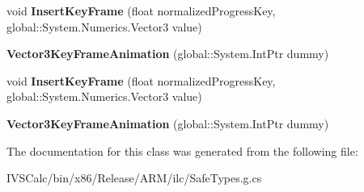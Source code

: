 \begin{DoxyCompactItemize}
\mbox{\label{class_windows_1_1_u_i_1_1_composition_1_1_vector3_key_frame_animation_a9aef830bf8f0a427819998607074969a}} 
void {\bfseries Insert\+Key\+Frame} (float normalized\+Progress\+Key, global\+::\+System.\+Numerics.\+Vector3 value)
\item 
\mbox{\label{class_windows_1_1_u_i_1_1_composition_1_1_vector3_key_frame_animation_aa2d2987cf82d5a743bc61cb07d999e8b}} 
{\bfseries Vector3\+Key\+Frame\+Animation} (global\+::\+System.\+Int\+Ptr dummy)
\item 
\mbox{\label{class_windows_1_1_u_i_1_1_composition_1_1_vector3_key_frame_animation_a9aef830bf8f0a427819998607074969a}} 
void {\bfseries Insert\+Key\+Frame} (float normalized\+Progress\+Key, global\+::\+System.\+Numerics.\+Vector3 value)
\item 
\mbox{\label{class_windows_1_1_u_i_1_1_composition_1_1_vector3_key_frame_animation_aa2d2987cf82d5a743bc61cb07d999e8b}} 
{\bfseries Vector3\+Key\+Frame\+Animation} (global\+::\+System.\+Int\+Ptr dummy)
\end{DoxyCompactItemize}


The documentation for this class was generated from the following file\+:\begin{DoxyCompactItemize}
\item 
I\+V\+S\+Calc/bin/x86/\+Release/\+A\+R\+M/ilc/Safe\+Types.\+g.\+cs\end{DoxyCompactItemize}
